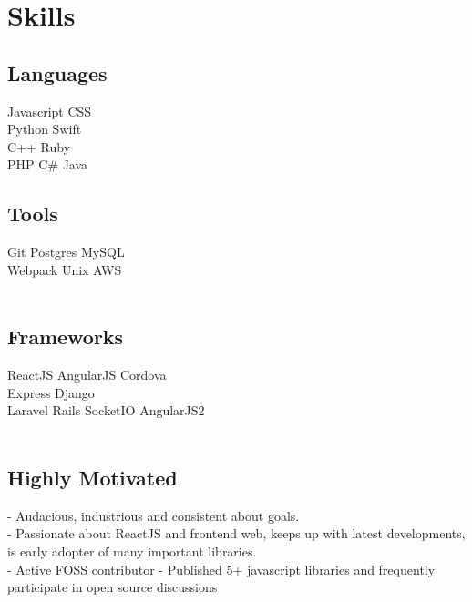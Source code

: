 \documentclass[]{deedy-resume-openfont}
\begin{document}
\begin{minipage}[t]{0.33\textwidth} 


\section{Skills}
\subsection{Languages}
Javascript \textbullet{} CSS \\
Python \textbullet{} Swift \\
C++ \textbullet{} Ruby \\
PHP \textbullet{} C\# \textbullet{} Java
\\[5pt]
\subsection{Tools}
Git \textbullet{} Postgres \textbullet{} MySQL \\
Webpack \textbullet{} Unix \textbullet{} AWS \\ 
\\[5pt]
\subsection{Frameworks}
ReactJS \textbullet{} AngularJS \textbullet{} Cordova \\
Express \textbullet{} Django \\
Laravel \textbullet{} Rails \textbullet{} SocketIO \textbullet{} AngularJS2 \\
\sectionsep
\\[5pt]
\subsection{Highly Motivated}
- Audacious, industrious and consistent about goals.\\
- Passionate about ReactJS and frontend web, keeps up with latest developments, is early adopter of many important libraries.\\
- Active FOSS contributor - Published 5+ javascript libraries and frequently participate in open source discussions
\sectionsep



\end{minipage}
\end{document}
